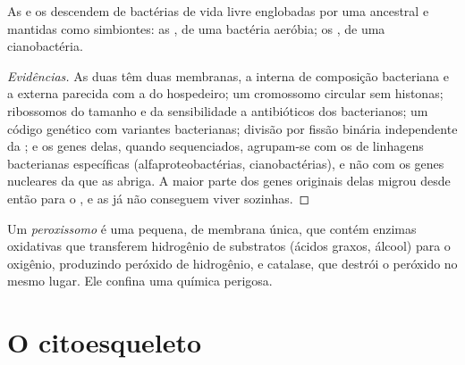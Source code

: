 \begin{proposition}\label{prop:b1:eukaryotic-cell:endosymbiosis}
As  e os  descendem de bactérias de vida livre
englobadas por uma  ancestral e mantidas como
simbiontes: as , de uma bactéria aeróbia; os , de
uma cianobactéria.
\end{proposition}
\begin{proof}[Evidências]
As duas  têm duas membranas, a interna de composição bacteriana
e a externa parecida com a do hospedeiro; um cromossomo circular sem
histonas; ribossomos do tamanho e da sensibilidade a antibióticos dos
bacterianos; um código genético com variantes bacterianas; divisão por
fissão binária independente da ; e os genes delas, quando
sequenciados, agrupam-se com os de linhagens bacterianas específicas
(alfaproteobactérias, cianobactérias), e não com os genes nucleares da
 que as abriga. A maior parte dos genes originais delas migrou
desde então para o , e as  já não conseguem viver
sozinhas.
\end{proof}

\begin{definition}[Peroxissomo]\label{def:b1:eukaryotic-cell:peroxisome}
Um \emph{peroxissomo} é uma  pequena, de
membrana única, que contém enzimas oxidativas que transferem hidrogênio
de substratos (ácidos graxos, álcool) para o oxigênio, produzindo
peróxido de hidrogênio, e catalase, que destrói o peróxido no mesmo
lugar. Ele confina uma química perigosa.
\end{definition}

\section{O citoesqueleto}


